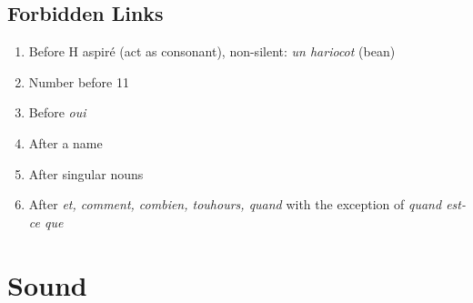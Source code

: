 \documentclass{book}
\begin{document}
    \section{Forbidden Links}
        \begin{enumerate}
            \item Before H aspiré (act as consonant), non-silent: \textit{un hariocot} \textipa{[ynarikO]} (bean)
            \item Number before 11
            \item Before \textit{oui}
            \item After a name
            \item After singular nouns
            \item After \textit{et, comment, combien, touhours, quand} with the exception of \textit{quand est-ce que}
        \end{enumerate}

\chapter{Sound}
\end{document}
